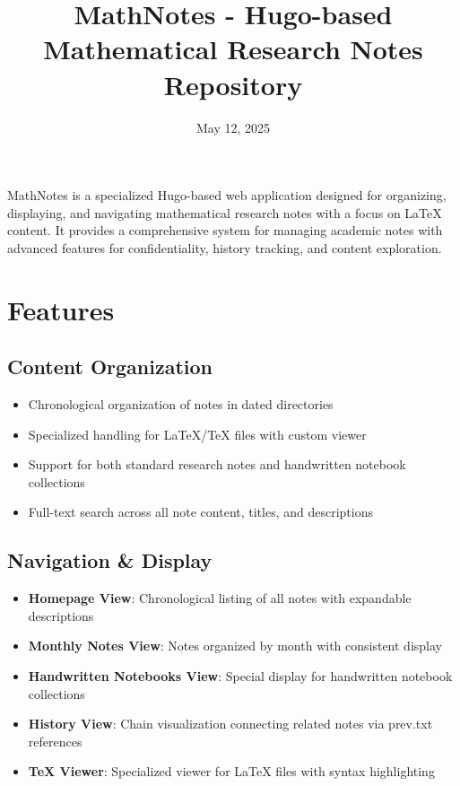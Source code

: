\documentclass{article}
\title{MathNotes - Hugo-based Mathematical Research Notes Repository}
\author{}
\date{May 12, 2025}
\begin{document}
\maketitle

MathNotes is a specialized Hugo-based web application designed for organizing, displaying, and navigating mathematical research notes with a focus on LaTeX content. It provides a comprehensive system for managing academic notes with advanced features for confidentiality, history tracking, and content exploration.

\section{Features}

\subsection{Content Organization}
\begin{itemize}
  \item Chronological organization of notes in dated directories
  \item Specialized handling for LaTeX/TeX files with custom viewer
  \item Support for both standard research notes and handwritten notebook collections
  \item Full-text search across all note content, titles, and descriptions
\end{itemize}

\subsection{Navigation \& Display}
\begin{itemize}
  \item \textbf{Homepage View}: Chronological listing of all notes with expandable descriptions
  \item \textbf{Monthly Notes View}: Notes organized by month with consistent display
  \item \textbf{Handwritten Notebooks View}: Special display for handwritten notebook collections
  \item \textbf{History View}: Chain visualization connecting related notes via prev.txt references
  \item \textbf{TeX Viewer}: Specialized viewer for LaTeX files with syntax highlighting
\end{itemize}
\end{document}
